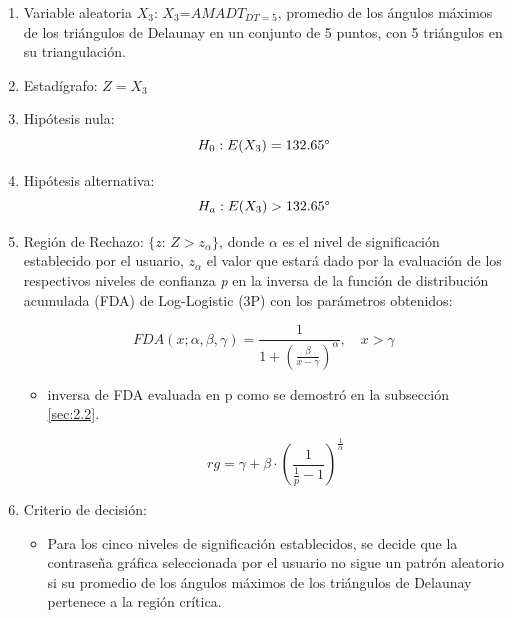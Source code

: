 \documentclass[12pt]{report}
\begin{document}
\begin{enumerate}
	\item Variable aleatoria $X_3$: $X_3$=$AMADT_{DT=5}$, promedio de los ángulos máximos de los triángulos de Delaunay en un conjunto de 5 puntos, con 5 triángulos en su triangulación.
	\item Estadígrafo: $Z=X_3$
	
	\item Hipótesis nula: \[H_0:E(X_3)=132.65\degree\]
	
	
	\item Hipótesis alternativa: \[H_a:E(X_3)>132.65\degree\]
	
	\item  Región de Rechazo: $\{z$: \;$Z>z_\alpha\}$, donde $\alpha$ es el nivel de significación establecido por el usuario,  $z_\alpha$  el valor que estará dado por la evaluación de los respectivos niveles de confianza \textit{p} en la  inversa de la función de distribución acumulada (FDA) de Log-Logistic (3P) con los parámetros obtenidos: 
	
	\[
	FDA(x; \alpha, \beta, \gamma) = \frac{1}{1 + \left( \frac{\beta}{x - \gamma} \right)^\alpha}, \quad x > \gamma
	\]
	\begin{itemize}
		\item inversa de FDA evaluada en p como se demostró en la subsección \ref{sec:2.2}.
		
	
		\[
		rg = \gamma + \beta \cdot \left( \frac{1}{\frac{1}{p}-1} \right)^{\frac{1}{\alpha}}
		\]
		
	\end{itemize}
	\item Criterio de decisión:
	\begin{itemize}
		\item Para los cinco niveles de significación establecidos, se decide que la contraseña gráfica seleccionada por el usuario no sigue un patrón aleatorio si su promedio de los ángulos máximos de los triángulos de Delaunay  pertenece a la región crítica. 
	\end{itemize}
\end{enumerate}
\end{document}
